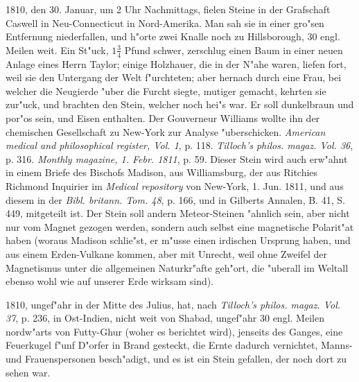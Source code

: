 \documentclass[a4paper, 11pt, oneside, polutonikogreek, german]{article}
\begin{document}
1810, den 30. Januar, um 2 Uhr Nachmittags, fielen Steine in der Grafschaft Caswell in Neu-Connecticut in Nord-Amerika. Man sah sie in einer gro"sen Entfernung niederfallen, und h"orte zwei Knalle noch zu Hillsborough, 30 engl. Meilen weit. Ein St"uck, $\mathfrak{1\frac{3}{4}}$ Pfund schwer, zerschlug einen Baum in einer neuen Anlage eines Herrn Taylor; einige Holzhauer, die in der N"ahe waren, liefen fort, weil sie den Untergang der Welt f"urchteten; aber hernach durch eine Frau, bei welcher die Neugierde "uber die Furcht siegte, mutiger gemacht, kehrten sie zur"uck, und brachten den Stein, welcher noch hei"s war. Er soll dunkelbraun und por"os sein, und Eisen enthalten. Der Gouverneur Williams wollte ihn der chemischen Gesellschaft zu New-York zur Analyse "uberschicken. \emph{American medical and philosophical register, Vol. 1}, p. 118. \emph{Tilloch's philos. magaz. Vol. 36}, p. 316. \emph{Monthly magazine, 1. Febr. 1811}, p. 59. Dieser Stein wird auch erw"ahnt in einem Briefe des Bischofs Madison, aus Williamsburg, der aus Ritchies Richmond Inquirier im \emph{Medical repository} von New-York, 1. Jun. 1811, und aus diesem in der \emph{Bibl. britann. Tom. 48}, p. 166, und in Gilberts Annalen, B. 41, S. 449, mitgeteilt ist. Der Stein soll andern Meteor-Steinen "ahnlich sein, aber nicht nur vom Magnet gezogen werden, sondern auch selbst eine magnetische Polarit"at haben (woraus Madison schlie"st, er m"usse einen irdischen Ursprung haben, und aus einem Erden-Vulkane kommen, aber mit Unrecht, weil ohne Zweifel der Magnetismus unter die allgemeinen Naturkr"afte geh"ort, die "uberall im Weltall ebenso wohl wie auf unserer Erde wirksam sind).

1810, ungef"ahr in der Mitte des Julius, hat, nach \emph{Tilloch's philos. magaz. Vol. 37}, p. 236, in Ost-Indien, nicht weit von Shabad, ungef"ahr 30 engl. Meilen nordw"arts von Futty-Ghur (woher es berichtet wird), jenseits des Ganges, eine Feuerkugel f"unf D"orfer in Brand gesteckt, die Ernte dadurch vernichtet, Manns- und Frauenspersonen besch"adigt, und es ist ein Stein gefallen, der noch dort zu sehen war.
\end{document}
